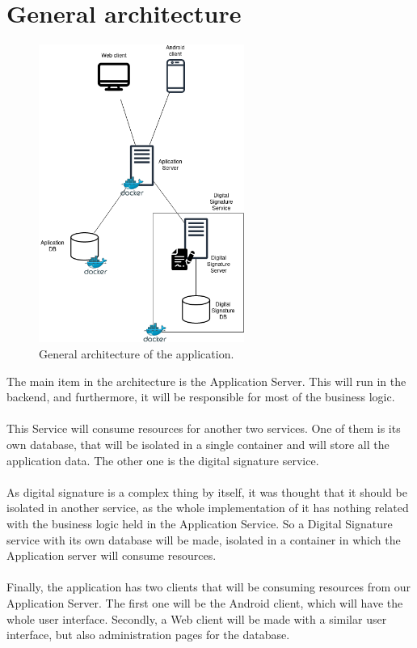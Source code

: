 \documentclass[./main.tex]{subfiles}
\begin{document}
\hypertarget{general-architecture}{%
\section{General architecture}\label{general-architecture}}

\begin{figure}[H]
\centering
\includegraphics[width=0.6\textwidth]{architecture_diagram/Architecture.drawio.png}
\caption{General architecture of the application.}
\end{figure}
The main item in the architecture is the Application Server. This 
will run in the backend, and furthermore, it will be
responsible for most of the business logic.
\\
\\
This Service will consume resources for another two services. One of
them is its own database, that will be isolated in a single container
and will store all the application data. The other one is the digital
signature service.
\\
\\
As digital signature is a complex thing by itself, it was thought that
it should be isolated in another service, as the whole implementation of
it has nothing related with the business logic held in the Application
Service. So a Digital Signature service with its own database will be
made, isolated in a container in which the Application server will
consume resources.
\\
\\
Finally, the application has two clients that will be consuming
resources from our Application Server. The first one will be the Android
client, which will have the whole user interface. Secondly, a Web client
will be made with a similar user interface, but also administration
pages for the database.
\end{document}
